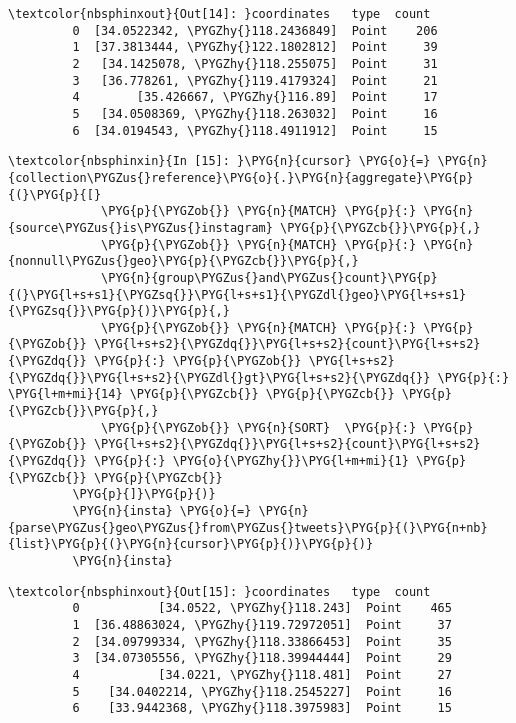 \documentclass[letterpaper,10pt,english]{sphinxmanual}
\begin{document}
%
\begin{Verbatim}[commandchars=\\\{\}]
\textcolor{nbsphinxout}{Out[14]: }coordinates   type  count
         0  [34.0522342, \PYGZhy{}118.2436849]  Point    206
         1  [37.3813444, \PYGZhy{}122.1802812]  Point     39
         2   [34.1425078, \PYGZhy{}118.255075]  Point     31
         3   [36.778261, \PYGZhy{}119.4179324]  Point     21
         4        [35.426667, \PYGZhy{}116.89]  Point     17
         5   [34.0508369, \PYGZhy{}118.263032]  Point     16
         6  [34.0194543, \PYGZhy{}118.4911912]  Point     15
\end{Verbatim}

%
\begin{Verbatim}[commandchars=\\\{\}]
\textcolor{nbsphinxin}{In [15]: }\PYG{n}{cursor} \PYG{o}{=} \PYG{n}{collection\PYGZus{}reference}\PYG{o}{.}\PYG{n}{aggregate}\PYG{p}{(}\PYG{p}{[}
             \PYG{p}{\PYGZob{}} \PYG{n}{MATCH} \PYG{p}{:} \PYG{n}{source\PYGZus{}is\PYGZus{}instagram} \PYG{p}{\PYGZcb{}}\PYG{p}{,}
             \PYG{p}{\PYGZob{}} \PYG{n}{MATCH} \PYG{p}{:} \PYG{n}{nonnull\PYGZus{}geo}\PYG{p}{\PYGZcb{}}\PYG{p}{,}
             \PYG{n}{group\PYGZus{}and\PYGZus{}count}\PYG{p}{(}\PYG{l+s+s1}{\PYGZsq{}}\PYG{l+s+s1}{\PYGZdl{}geo}\PYG{l+s+s1}{\PYGZsq{}}\PYG{p}{)}\PYG{p}{,}
             \PYG{p}{\PYGZob{}} \PYG{n}{MATCH} \PYG{p}{:} \PYG{p}{\PYGZob{}} \PYG{l+s+s2}{\PYGZdq{}}\PYG{l+s+s2}{count}\PYG{l+s+s2}{\PYGZdq{}} \PYG{p}{:} \PYG{p}{\PYGZob{}} \PYG{l+s+s2}{\PYGZdq{}}\PYG{l+s+s2}{\PYGZdl{}gt}\PYG{l+s+s2}{\PYGZdq{}} \PYG{p}{:} \PYG{l+m+mi}{14} \PYG{p}{\PYGZcb{}} \PYG{p}{\PYGZcb{}} \PYG{p}{\PYGZcb{}}\PYG{p}{,}
             \PYG{p}{\PYGZob{}} \PYG{n}{SORT}  \PYG{p}{:} \PYG{p}{\PYGZob{}} \PYG{l+s+s2}{\PYGZdq{}}\PYG{l+s+s2}{count}\PYG{l+s+s2}{\PYGZdq{}} \PYG{p}{:} \PYG{o}{\PYGZhy{}}\PYG{l+m+mi}{1} \PYG{p}{\PYGZcb{}} \PYG{p}{\PYGZcb{}}
         \PYG{p}{]}\PYG{p}{)}
         \PYG{n}{insta} \PYG{o}{=} \PYG{n}{parse\PYGZus{}geo\PYGZus{}from\PYGZus{}tweets}\PYG{p}{(}\PYG{n+nb}{list}\PYG{p}{(}\PYG{n}{cursor}\PYG{p}{)}\PYG{p}{)}
         \PYG{n}{insta}
\end{Verbatim}

%
\begin{Verbatim}[commandchars=\\\{\}]
\textcolor{nbsphinxout}{Out[15]: }coordinates   type  count
         0           [34.0522, \PYGZhy{}118.243]  Point    465
         1  [36.48863024, \PYGZhy{}119.72972051]  Point     37
         2  [34.09799334, \PYGZhy{}118.33866453]  Point     35
         3  [34.07305556, \PYGZhy{}118.39944444]  Point     29
         4           [34.0221, \PYGZhy{}118.481]  Point     27
         5    [34.0402214, \PYGZhy{}118.2545227]  Point     16
         6    [33.9442368, \PYGZhy{}118.3975983]  Point     15
\end{Verbatim}
\end{document}
